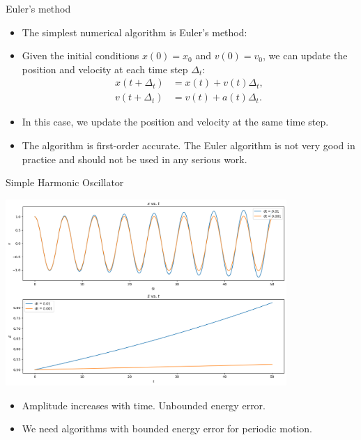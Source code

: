 \documentclass{beamer}
\begin{document}
\begin{frame}{Euler's method}
  \begin{itemize}
    \item The simplest numerical algorithm is Euler's method:
    \item Given the initial conditions $x(0)=x_0$ and $v(0)=v_0$, we can update the position and velocity at each time step $\Delta_t$:
    \begin{align*}
      x(t+\Delta_t) &= x(t)+v(t)\Delta_t,\\
      v(t+\Delta_t) &= v(t)+a(t)\Delta_t.
    \end{align*}
    \item In this case, we update the position and velocity at the same time step.
    \item The algorithm is first-order accurate. The Euler algorithm is not very good in practice and  should not be used in any serious work.
  \end{itemize}
\end{frame}
\begin{frame}{Simple Harmonic Oscillator}
\centerline{\includegraphics[width=0.8\textwidth]{./eulercmp.png}}
\begin{itemize}
  \item Amplitude increases with time. Unbounded energy error.
  \item We need algorithms with bounded energy error for periodic motion.
\end{itemize}
\end{frame}
\end{document}

